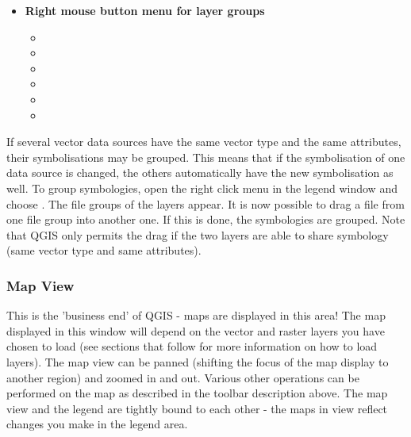 \begin{itemize}
\item \textbf{Right mouse button menu for layer groups} 
\begin{itemize}
\item {}
\item {}
\item {}
\item {}
\item {}
\item {}
\end{itemize}

\end{itemize}

If several vector data sources have the same vector type and the same attributes, their 
symbolisations may be grouped. This means that if the symbolisation of one data source is 
changed, the others automatically have the new symbolisation as well. To group symbologies, open 
the right click menu in the legend window and choose . The file groups of the 
layers appear. It is now possible to drag a file from one file group into another one. If this is done, 
the symbologies are grouped. Note that QGIS only permits the drag if the two layers are able to share 
symbology (same vector type and same attributes).  

%

\subsubsection{Map View}\label{label_mapview}

This is the 'business end' of QGIS - maps are displayed in this area! The
map displayed in this window will depend on the vector and raster layers you
have chosen to load (see sections that follow for more information on how to
load layers). The map view can be panned (shifting the focus of the map display
to another region) and zoomed in and out. Various other operations can be
performed on the map as described in the toolbar description above.  The map
view and the legend are tightly bound to each other - the maps in view reflect
changes you make in the legend area.  

